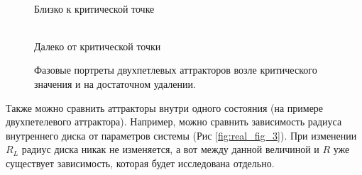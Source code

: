 \documentclass[12pt]{article}
\begin{document}
\begin{figure}[H]
	\centering
	\begin{minipage}[h]{0.47\linewidth}
		  \\ Близко к критической точке
	\end{minipage}
		\hfill
	\begin{minipage}[h]{0.47\linewidth}
		 \\ Далеко от критической точки
	\end{minipage}
	\caption{Фазовые портреты двухпетлевых аттракторов возле критического значения и на достаточном удалении.}
	\label{fig:real_fig_2}
\end{figure}

Также можно сравнить аттракторы внутри одного состояния (на примере двухпетелевого аттрактора). Например, можно сравнить зависимость радиуса внутреннего диска от параметров системы (Рис \ref{fig:real_fig_3}).
При изменении $R_L$ радиус диска никак не изменяется, а вот между данной величиной и $R$ уже существует зависимость, которая будет исследована отдельно. 
\end{document}
